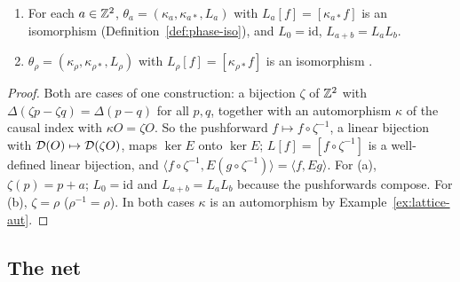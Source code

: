 \begin{proposition}\label{prop:lattice-iso}
\begin{enumerate}[label=(\alph*),leftmargin=2.5em]
\item For each $a\in\mathbb Z^2$, $\theta_a=(\kappa_a,\kappa_{a*},L_a)$ with  $L_a[f]=[\kappa_{a*}f]$ is an
isomorphism  (Definition~\ref{def:phase-iso}), and $L_0=\mathrm{id}$,
$L_{a+b}=L_aL_b$.
\item $\theta_\rho=(\kappa_\rho,\kappa_{\rho*},L_\rho)$ with  $L_\rho[f]=[\kappa_{\rho*}f]$ is an
isomorphism .
\end{enumerate}
\end{proposition}
\begin{proof}
Both are cases of one construction: a bijection $\zeta$ of $\mathbb Z^2$ with
$\Delta(\zeta p-\zeta q)=\Delta(p-q)$ for all $p,q$, together with an automorphism $\kappa$ of the
causal index with $\kappa O=\zeta O$.  So the pushforward
$f\mapsto f\circ\zeta^{-1}$, a linear bijection with $\mathcal D(O)\mapsto\mathcal D(\zeta O)$, maps $\ker E$
onto $\ker E$; $L[f]=[f\circ\zeta^{-1}]$ is a well-defined linear bijection, and $\langle
f\circ\zeta^{-1},E(g\circ\zeta^{-1})\rangle=\langle f,Eg\rangle$. For (a), $\zeta(p)=p+a$;
$L_0=\mathrm{id}$ and $L_{a+b}=L_aL_b$ because the pushforwards compose. For (b), $\zeta=\rho$
($\rho^{-1}=\rho$). In both cases $\kappa$ is an automorphism by
Example~\ref{ex:lattice-aut}.
\end{proof}
\noindent{}

\subsection{The net}

